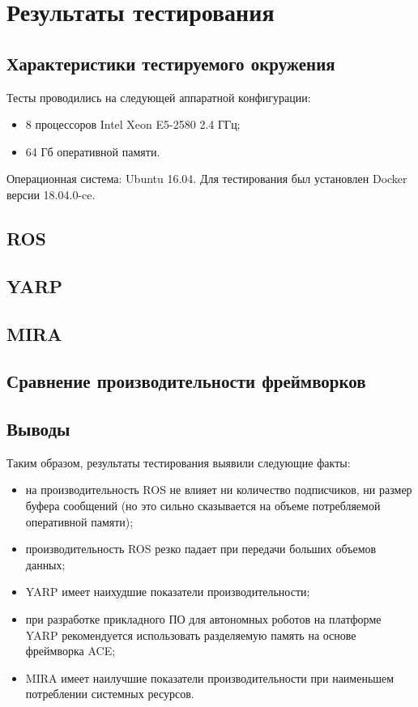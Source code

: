 \chapter{Результаты тестирования}
\section{Характеристики тестируемого окружения}
	Тесты проводились на следующей аппаратной конфигурации:
	\begin{itemize}[noitemsep]
		\item 8 процессоров Intel Xeon E5-2580 2.4 ГГц;
		\item 64 Гб оперативной памяти.
	\end{itemize}
	Операционная система: Ubuntu 16.04. Для тестирования был установлен Docker версии 18.04.0-ce.
\section{ROS}
\label{title:chapter3:ros}

\section{YARP}
\label{title:chapter3:yarp}

\section{MIRA}
\label{title:chapter3:mira}

\section{Сравнение производительности фреймворков}
\label{title:chapter3:compharison}

\section{Выводы}
Таким образом, результаты тестирования выявили следующие факты:
\begin{itemize}
	\item на производительность ROS не влияет ни количество подписчиков, ни размер буфера сообщений (но это сильно сказывается на объеме потребляемой оперативной памяти);
	\item производительность ROS резко падает при передачи больших объемов данных;
	\item YARP имеет наихудшие показатели производительности;
	\item при разработке прикладного ПО для автономных роботов на платформе YARP рекомендуется использовать разделяемую память на основе фреймворка ACE;
	\item MIRA имеет наилучшие показатели производительности при наименьшем потреблении системных ресурсов.
\end{itemize}
